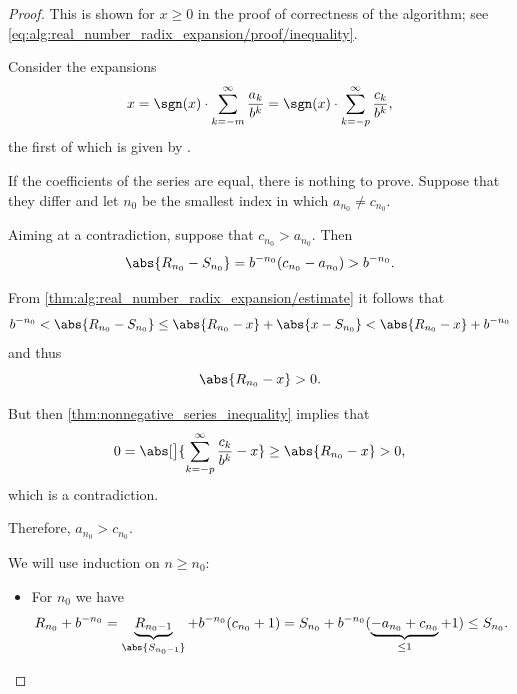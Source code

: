\begin{proof}
   This is shown for \( x \geq 0 \) in the proof of correctness of the algorithm; see \eqref{eq:alg:real_number_radix_expansion/proof/inequality}.

   Consider the expansions
  \begin{equation*}
    x = \sgn(x) \cdot \sum_{k=-m}^\infty \frac {a_k} {b^k} = \sgn(x) \cdot \sum_{k=-p}^\infty \frac {c_k} {b^k},
  \end{equation*}
  the first of which is given by .

  If the coefficients of the series are equal, there is nothing to prove. Suppose that they differ and let \( n_0 \) be the smallest index in which \( a_{n_0} \neq c_{n_0} \).

   Aiming at a contradiction, suppose that \( c_{n_0} > a_{n_0} \). Then
  \begin{equation*}
    \abs{R_{n_0} - S_{n_0}} = b^{-n_0} (c_{n_0} - a_{n_0}) > b^{-n_0}.
  \end{equation*}

  From \cref{thm:alg:real_number_radix_expansion/estimate} it follows that
  \begin{equation*}
    b^{-n_0} < \abs{R_{n_0} - S_{n_0}} \leq \abs{R_{n_0} - x} + \abs{x - S_{n_0}} < \abs{R_{n_0} - x} + b^{-n_0}
  \end{equation*}
  and thus
  \begin{equation*}
    \abs{R_{n_0} - x} > 0.
  \end{equation*}

  But then \cref{thm:nonnegative_series_inequality} implies that
  \begin{equation*}
    0 = \abs[\big]{\sum_{k=-p}^\infty \frac {c_k} {b^k} - x} \geq \abs{R_{n_0} - x} > 0,
  \end{equation*}
  which is a contradiction.

  Therefore, \( a_{n_0} > c_{n_0} \).

   We will use induction on \( n \geq n_0 \):
  \begin{itemize}
    \item For \( n_0 \) we have
    \begin{equation*}
      R_{n_0} + b^{-n_0}
      =
      \underbrace{R_{n_0-1}}_{\abs{S_{n_0-1}}} + b^{-n_0} (c_{n_0} + 1)
      =
      S_{n_0} + b^{-n_0} (\underbrace{-a_{n_0} + c_{n_0}}_{\leq 1} + 1)
      \leq
      S_{n_0}.
    \end{equation*}


\end{itemize}
\end{proof}
